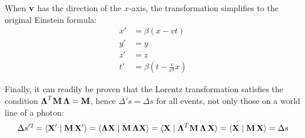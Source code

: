 \documentclass[12pt]{article}
\newcommand{\ip}[2]{\langle #1 \mid #2 \rangle}
\begin{document}
When $\vb{v}$ has the direction of the $x$-axis, the transformation simplifies to the original
Einstein formula:
\begin{align}
  x' &= \beta(x - vt)               \nonumber \\
  y' &= y                            \nonumber \\
  z' &= z                            \nonumber \\
  t' &= \beta\!\left(t - \frac{v}{c^2}x\right)
  \label{eq:Lorentz_1d}
\end{align}

Finally, it can readily be proven that the Lorentz transformation satisfies the condition
$\boldsymbol{\Lambda}^T\vb{M}\,\boldsymbol{\Lambda} = \vb{M}$, hence $\Delta' s = \Delta s$
for all events, not only those on a world line of a photon:
\begin{equation}
  \Delta s'^2
  = \ip{\vb{X}'}{\vb{M}\,\vb{X}'}
  = \ip{\boldsymbol{\Lambda}\vb{X}}{\vb{M}\,\boldsymbol{\Lambda}\vb{X}}
  = \ip{\vb{X}}{\boldsymbol{\Lambda}^T\vb{M}\,\boldsymbol{\Lambda}\,\vb{X}}
  = \ip{\vb{X}}{\vb{M}\,\vb{X}}
  = \Delta s
  \label{eq:spacetime_interval_invariance}
\end{equation}
\end{document}
